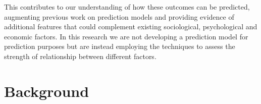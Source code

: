 \documentclass[sigconf]{acmart}
\begin{document}
This contributes to our understanding of how these outcomes can be predicted, augmenting previous work on prediction models and providing evidence of additional features that could complement existing sociological, psychological and economic factors. In this research we are not developing a prediction model for prediction purposes but are instead employing the techniques to assess the strength of relationship between different factors.

\section {Background}

\end{document}
